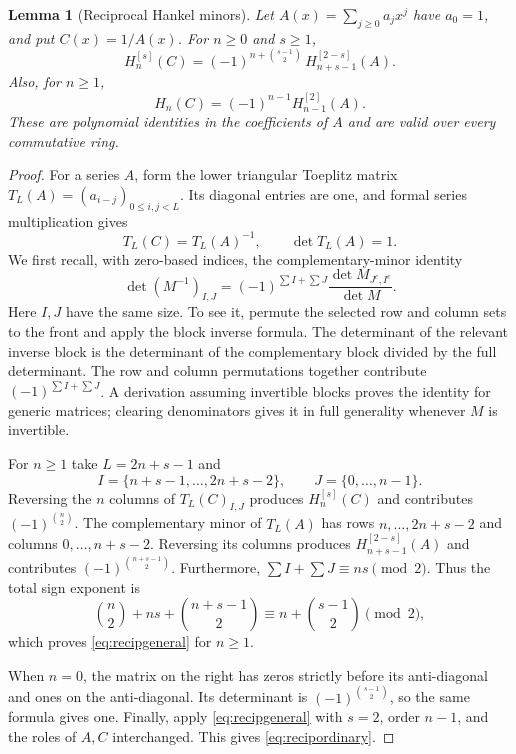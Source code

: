 \documentclass[11pt,a4paper]{article}
\numberwithin{equation}{section}
\newtheorem{lemma}[theorem]{Lemma}
\theoremstyle{definition}
\theoremstyle{remark}
\begin{document}
\begin{lemma}[Reciprocal Hankel minors]\label{lem:reciprocal}
Let $A(x)=\sum_{j\ge0}a_jx^j$ have $a_0=1$, and put $C(x)=1/A(x)$.
For $n\ge0$ and $s\ge1$,
\begin{equation}\label{eq:recipgeneral}
 H_n^{[s]}(C)
 =(-1)^{n+\binom{s-1}{2}}\,
 H_{n+s-1}^{[2-s]}(A).
\end{equation}
Also, for $n\ge1$,
\begin{equation}\label{eq:recipordinary}
 H_n(C)=(-1)^{n-1}H_{n-1}^{[2]}(A).
\end{equation}
These are polynomial identities in the coefficients of $A$ and are
valid over every commutative ring.
\end{lemma}
\begin{proof}
For a series $A$, form the lower triangular Toeplitz matrix
$T_L(A)=(a_{i-j})_{0\le i,j<L}$. Its diagonal entries are one, and
formal series multiplication gives
\[
 T_L(C)=T_L(A)^{-1},\qquad \det T_L(A)=1.
\]
We first recall, with zero-based indices, the complementary-minor
identity
\begin{equation}\label{eq:jacobiminor}
 \det(M^{-1})_{I,J}
 =(-1)^{\sum I+\sum J}\frac{\det M_{J^c,I^c}}{\det M}.
\end{equation}
Here $I,J$ have the same size. To see it, permute the selected row and
column sets to the front and apply the block inverse formula. The
determinant of the relevant inverse block is the determinant of the
complementary block divided by the full determinant. The row and
column permutations together contribute $(-1)^{\sum I+\sum J}$.
A derivation assuming invertible blocks proves the identity for generic
matrices; clearing denominators gives it in full generality whenever
$M$ is invertible.

For $n\ge1$ take $L=2n+s-1$ and
\[
 I=\{n+s-1,\ldots,2n+s-2\},\qquad J=\{0,\ldots,n-1\}.
\]
Reversing the $n$ columns of $T_L(C)_{I,J}$ produces
$H_n^{[s]}(C)$ and contributes $(-1)^{\binom n2}$. The complementary
minor of $T_L(A)$ has rows $n,\ldots,2n+s-2$ and columns
$0,\ldots,n+s-2$. Reversing its columns produces
$H_{n+s-1}^{[2-s]}(A)$ and contributes
$(-1)^{\binom{n+s-1}{2}}$. Furthermore,
$\sum I+\sum J\equiv ns\pmod2$. Thus the total sign exponent is
\[
 \binom n2+ns+\binom{n+s-1}{2}
 \equiv n+\binom{s-1}{2}\pmod2,
\]
which proves \eqref{eq:recipgeneral} for $n\ge1$.

When $n=0$, the matrix on the right has zeros strictly before its
anti-diagonal and ones on the anti-diagonal. Its determinant is
$(-1)^{\binom{s-1}{2}}$, so the same formula gives one. Finally, apply
\eqref{eq:recipgeneral} with $s=2$, order $n-1$, and the roles of $A,C$
interchanged. This gives \eqref{eq:recipordinary}.
\end{proof}
\end{document}
